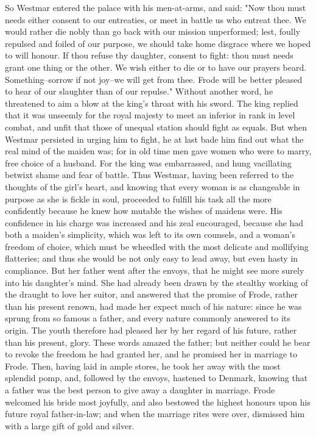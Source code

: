 \documentclass[10pt,a4paper]{report}
\begin{document}
So Westmar entered the palace with his men-at-arms, and said: "Now thou must needs either consent to our entreaties, or meet in battle us who entreat thee. We would rather die nobly than go back with our mission unperformed; lest, foully repulsed and foiled of our purpose, we should take home disgrace where we hoped to will honour. If thou refuse thy daughter, consent to fight: thou must needs grant one thing or the other. We wish either to die or to have our prayers beard. Something--sorrow if not joy--we will get from thee. Frode will be better pleased to hear of our slaughter than of our repulse." Without another word, he threatened to aim a blow at the king's throat with his sword. The king replied that it was unseemly for the royal majesty to meet an inferior in rank in level combat, and unfit that those of unequal station should fight as equals. But when Westmar persisted in urging him to fight, he at last bade him find out what the real mind of the maiden was; for in old time men gave women who were to marry, free choice of a husband. For the king was embarrassed, and hung vacillating betwixt shame and fear of battle. Thus Westmar, having been referred to the thoughts of the girl's heart, and knowing that every woman is as changeable in purpose as she is fickle in soul, proceeded to fulfill his task all the more confidently because he knew how mutable the wishes of maidens were. His confidence in his charge was increased and his zeal encouraged, because she had both a maiden's simplicity, which was left to its own counsels, and a woman's freedom of choice, which must be wheedled with the most delicate and mollifying flatteries; and thus she would be not only easy to lead away, but even hasty in compliance. But her father went after the envoys, that he might see more surely into his daughter's mind. She had already been drawn by the stealthy working of the draught to love her suitor, and answered that the promise of Frode, rather than his present renown, had made her expect much of his nature: since he was sprung from so famous a father, and every nature commonly answered to its origin. The youth therefore had pleased her by her regard of his future, rather than his present, glory. These words amazed the father; but neither could he bear to revoke the freedom he had granted her, and he promised her in marriage to Frode. Then, having laid in ample stores, he took her away with the most splendid pomp, and, followed by the envoys, hastened to Denmark, knowing that a father was the best person to give away a daughter in marriage. Frode welcomed his bride most joyfully, and also bestowed the highest honours upon his future royal father-in-law; and when the marriage rites were over, dismissed him with a large gift of gold and silver.\\
\end{document}
